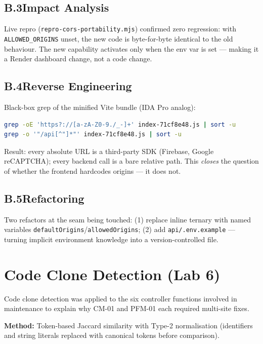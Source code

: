 \documentclass[11pt,a4paper]{article}
\begin{document}
\subsection{B.3\quad Impact Analysis}

Live repro (\texttt{repro-cors-portability.mjs}) confirmed zero regression:
with \texttt{ALLOWED\_ORIGINS} unset, the new code is byte-for-byte identical
to the old behaviour. The new capability activates only when the env var is set ---
making it a Render dashboard change, not a code change.

\subsection{B.4\quad Reverse Engineering}

Black-box grep of the minified Vite bundle (IDA Pro analog):
\begin{lstlisting}[language=bash]
grep -oE 'https?://[a-zA-Z0-9./_-]+' index-71cf8e48.js | sort -u
grep -o '"/api[^"]*"' index-71cf8e48.js | sort -u
\end{lstlisting}
Result: every absolute URL is a third-party SDK (Firebase, Google reCAPTCHA);
every backend call is a bare relative path. This \emph{closes} the question of whether
the frontend hardcodes origins --- it does not.

\subsection{B.5\quad Refactoring}

Two refactors at the seam being touched: (1) replace inline ternary with named variables
\texttt{defaultOrigins}/\texttt{allowedOrigins}; (2) add \texttt{api/.env.example} ---
turning implicit environment knowledge into a version-controlled file.

\newpage
\section{Code Clone Detection (Lab 6)}

Code clone detection was applied to the six controller functions involved in
maintenance to explain why CM-01 and PFM-01 each required multi-site fixes.

\medskip\noindent\textbf{Method:} Token-based Jaccard similarity with Type-2 normalisation
(identifiers and string literals replaced with canonical tokens before comparison).
\end{document}
